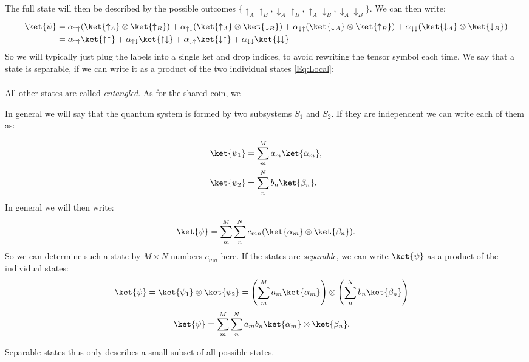 The full state will then be described by the possible outcomes $\{\uparrow_A\uparrow_B,\downarrow_A\uparrow_B,\uparrow_A\downarrow_B, \downarrow_A\downarrow_B\}$. We can then write:
\begin{align}
\ket{\psi} &= \alpha_{\uparrow\uparrow}(\ket{\uparrow_A}\otimes\ket{\uparrow_B})+\alpha_{\uparrow\downarrow}(\ket{\uparrow_A}\otimes\ket{\downarrow_B})+\alpha_{\downarrow\uparrow}(\ket{\downarrow_A}\otimes\ket{\uparrow_B})+\alpha_{\downarrow\downarrow}(\ket{\downarrow_A}\otimes\ket{\downarrow_B})\\
&= \alpha_{\uparrow\uparrow}\ket{\uparrow\uparrow}+\alpha_{\uparrow\downarrow}\ket{\uparrow\downarrow}+\alpha_{\downarrow\uparrow}\ket{\downarrow \uparrow}+\alpha_{\downarrow\downarrow}\ket{\downarrow\downarrow}
\end{align}
So we will typically just plug the labels into a single ket and drop indices, to avoid rewriting the tensor symbol each time. We say that a state is separable, if we can write it as a product of the two individual states \eqref{Eq:Local}:
\begin{align}

\end{align}

All other states are called \textit{entangled}. As for the shared coin, we


In general we will say that the quantum system is formed by two subsystems $S_1$ and $S_2$. If they are independent we can write each of them as:

\begin{align}
				\ket{\psi_1}&=\sum_m^M a_m \ket{\alpha_m},\\
				\ket{\psi_2}&=\sum_n^N b_n \ket{\beta_n}.
			
\end{align}
In general we will then write:
\begin{align}
\ket{\psi}=\sum_m^M \sum_n^N c_{mn}(\ket{\alpha_m}\otimes \ket{\beta_n}).
\end{align}
So we can determine such a state by $M \times N$ numbers $c_{mn}$ here.  If the states are \textit{separable}, we can write $\ket{\psi}$ as a product of the individual states:
\begin{align}
 \label{eq:psientangled} 
	\ket{\psi}	&=\ket{\psi_1}\otimes\ket{\psi_2}=\left(\sum_m^M a_m \ket{\alpha_m}\right) \otimes \left(\sum_n^N b_n \ket{\beta_n}\right)
\end{align}
\begin{align}
\ket{\psi}	&=\sum_m^M \sum_n^N a_m b_n \ket{\alpha_m} \otimes \ket{\beta_n}. \label{eq:psientangled3} 
\end{align}

Separable states thus only describes a small subset of all possible states. 
